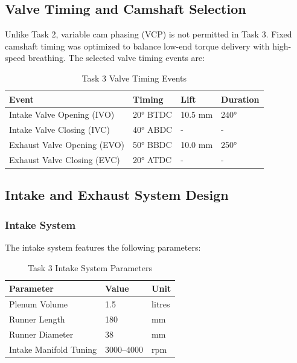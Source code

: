 \subsection{Valve Timing and Camshaft Selection}

Unlike Task 2, variable cam phasing (VCP) is not permitted in Task 3. Fixed camshaft timing was optimized to balance low-end torque delivery with high-speed breathing. The selected valve timing events are:

\begin{table}[H]
\centering
\caption{Task 3 Valve Timing Events}
\label{tab:task3_valve_timing}
\small
\begin{tabular}{@{}llll@{}}
\toprule
\textbf{Event} & \textbf{Timing} & \textbf{Lift} & \textbf{Duration} \\
\midrule
Intake Valve Opening (IVO) & 20° BTDC & 10.5 mm & 240° \\
Intake Valve Closing (IVC) & 40° ABDC & - & - \\
Exhaust Valve Opening (EVO) & 50° BBDC & 10.0 mm & 250° \\
Exhaust Valve Closing (EVC) & 20° ATDC & - & - \\
\bottomrule
\end{tabular}
\end{table}

\subsection{Intake and Exhaust System Design}

\subsubsection{Intake System}

The intake system features the following parameters:

\begin{table}[H]
\centering
\caption{Task 3 Intake System Parameters}
\label{tab:task3_intake}
\small
\begin{tabular}{@{}lll@{}}
\toprule
\textbf{Parameter} & \textbf{Value} & \textbf{Unit} \\
\midrule
Plenum Volume & 1.5 & litres \\
Runner Length & 180 & mm \\
Runner Diameter & 38 & mm \\
Intake Manifold Tuning & 3000--4000 & rpm \\
\bottomrule
\end{tabular}
\end{table}

